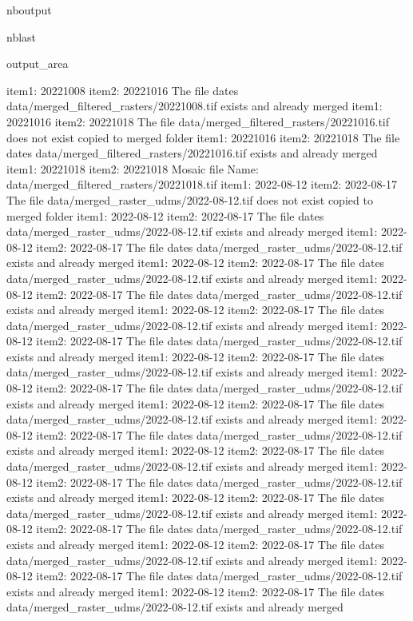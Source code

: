 \documentclass[letterpaper,10pt]{sphinxmanual}
\begin{document}
\begin{sphinxuseclass}{nboutput}
\begin{sphinxuseclass}{nblast}
{\begin{sphinxuseclass}{output_area}
\begin{sphinxuseclass}{}
\begin{sphinxVerbatim}[commandchars=\\\{\}]
item1:  20221008
item2:  20221016
The file dates data/merged\_filtered\_rasters/20221008.tif exists and already merged
item1:  20221016
item2:  20221018
The file data/merged\_filtered\_rasters/20221016.tif does not exist copied to merged folder
item1:  20221016
item2:  20221018
The file dates data/merged\_filtered\_rasters/20221016.tif exists and already merged
item1:  20221018
item2:  20221018
Mosaic file Name:  data/merged\_filtered\_rasters/20221018.tif
item1:  2022-08-12
item2:  2022-08-17
The file data/merged\_raster\_udms/2022-08-12.tif does not exist copied to merged folder
item1:  2022-08-12
item2:  2022-08-17
The file dates data/merged\_raster\_udms/2022-08-12.tif exists and already merged
item1:  2022-08-12
item2:  2022-08-17
The file dates data/merged\_raster\_udms/2022-08-12.tif exists and already merged
item1:  2022-08-12
item2:  2022-08-17
The file dates data/merged\_raster\_udms/2022-08-12.tif exists and already merged
item1:  2022-08-12
item2:  2022-08-17
The file dates data/merged\_raster\_udms/2022-08-12.tif exists and already merged
item1:  2022-08-12
item2:  2022-08-17
The file dates data/merged\_raster\_udms/2022-08-12.tif exists and already merged
item1:  2022-08-12
item2:  2022-08-17
The file dates data/merged\_raster\_udms/2022-08-12.tif exists and already merged
item1:  2022-08-12
item2:  2022-08-17
The file dates data/merged\_raster\_udms/2022-08-12.tif exists and already merged
item1:  2022-08-12
item2:  2022-08-17
The file dates data/merged\_raster\_udms/2022-08-12.tif exists and already merged
item1:  2022-08-12
item2:  2022-08-17
The file dates data/merged\_raster\_udms/2022-08-12.tif exists and already merged
item1:  2022-08-12
item2:  2022-08-17
The file dates data/merged\_raster\_udms/2022-08-12.tif exists and already merged
item1:  2022-08-12
item2:  2022-08-17
The file dates data/merged\_raster\_udms/2022-08-12.tif exists and already merged
item1:  2022-08-12
item2:  2022-08-17
The file dates data/merged\_raster\_udms/2022-08-12.tif exists and already merged
item1:  2022-08-12
item2:  2022-08-17
The file dates data/merged\_raster\_udms/2022-08-12.tif exists and already merged
item1:  2022-08-12
item2:  2022-08-17
The file dates data/merged\_raster\_udms/2022-08-12.tif exists and already merged
item1:  2022-08-12
item2:  2022-08-17
The file dates data/merged\_raster\_udms/2022-08-12.tif exists and already merged
item1:  2022-08-12
item2:  2022-08-17
The file dates data/merged\_raster\_udms/2022-08-12.tif exists and already merged
item1:  2022-08-12
item2:  2022-08-17
The file dates data/merged\_raster\_udms/2022-08-12.tif exists and already merged

\end{sphinxVerbatim}
\end{sphinxuseclass}
\end{sphinxuseclass}}
\end{sphinxuseclass}
\end{sphinxuseclass}
\end{document}
